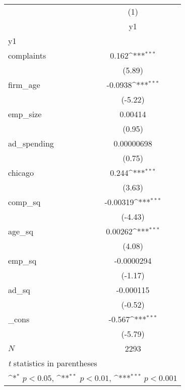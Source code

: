 {
\def\sym#1{\ifmmode^{#1}\else\(^{#1}\)\fi}
\begin{tabular}{l*{1}{c}}
\hline\hline
            &\multicolumn{1}{c}{(1)}\\
            &\multicolumn{1}{c}{y1}\\
\hline
y1          &                     \\
complaints  &       0.162\sym{***}\\
            &      (5.89)         \\
[1em]
firm\_age    &     -0.0938\sym{***}\\
            &     (-5.22)         \\
[1em]
emp\_size    &     0.00414         \\
            &      (0.95)         \\
[1em]
ad\_spending &  0.00000698         \\
            &      (0.75)         \\
[1em]
chicago     &       0.244\sym{***}\\
            &      (3.63)         \\
[1em]
comp\_sq     &    -0.00319\sym{***}\\
            &     (-4.43)         \\
[1em]
age\_sq      &     0.00262\sym{***}\\
            &      (4.08)         \\
[1em]
emp\_sq      &  -0.0000294         \\
            &     (-1.17)         \\
[1em]
ad\_sq       &   -0.000115         \\
            &     (-0.52)         \\
[1em]
\_cons      &      -0.567\sym{***}\\
            &     (-5.79)         \\
\hline
\(N\)       &        2293         \\
\hline\hline
\multicolumn{2}{l}{\footnotesize \textit{t} statistics in parentheses}\\
\multicolumn{2}{l}{\footnotesize \sym{*} \(p<0.05\), \sym{**} \(p<0.01\), \sym{***} \(p<0.001\)}\\
\end{tabular}
}
